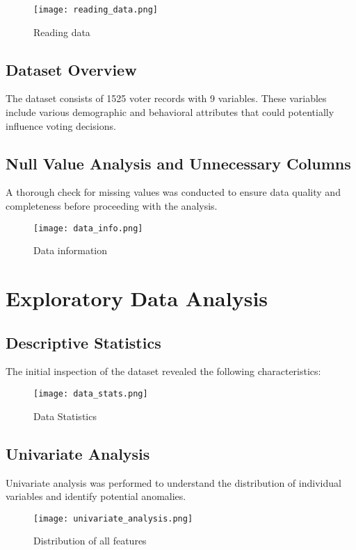 \documentclass[12pt]{article}
\begin{document}
\begin{figure}[h]
    \centering
    \texttt{[image: reading\_data.png]}
    \caption{Reading data}
    \label{fig:example}
\end{figure}

\subsection{Dataset Overview}
The dataset consists of 1525 voter records with 9 variables. These variables include various demographic and behavioral attributes that could potentially influence voting decisions.

\subsection{Null Value Analysis and Unnecessary Columns}
A thorough check for missing values was conducted to ensure data quality and completeness before proceeding with the analysis.

\begin{figure}[h]
    \centering
    \texttt{[image: data\_info.png]}
    \caption{Data information}
    \label{fig:example}
\end{figure}

\section{Exploratory Data Analysis}

\subsection{Descriptive Statistics}
The initial inspection of the dataset revealed the following characteristics:

\begin{figure}[h]
    \centering
    \texttt{[image: data\_stats.png]}
    \caption{Data Statistics}
    \label{fig:example}
\end{figure}


\subsection{Univariate Analysis}
Univariate analysis was performed to understand the distribution of individual variables and identify potential anomalies.


\begin{figure}[h]
    \centering
    \texttt{[image: univariate\_analysis.png]}
    \caption{Distribution of all features}
    \label{fig:example}
\end{figure}
\end{document}
